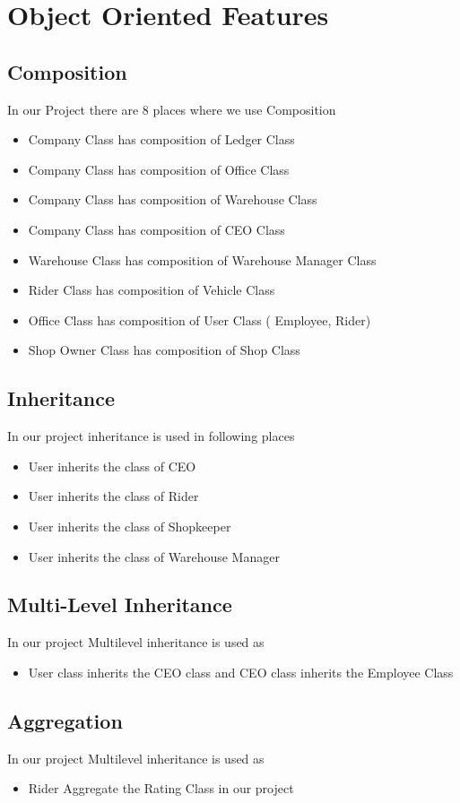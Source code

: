 \documentclass[12pt,a4paper]{article}
\begin{document}
\section{Object Oriented Features}
\subsection{Composition}
In our Project there are 8 places where we use Composition
\begin{itemize}
\item   Company Class has composition of Ledger Class
\item  Company Class has composition of Office Class
\item  Company Class has composition of Warehouse Class
\item  Company Class has composition of CEO Class
\item  Warehouse Class has composition of  Warehouse Manager Class
\item  Rider Class has composition of Vehicle Class
\item  Office Class has composition of User Class ( Employee, Rider)
\item  Shop Owner Class has composition of Shop Class
\end{itemize}
\subsection{Inheritance}
In our project inheritance is used in following places
\begin{itemize}
\item   User inherits the class of CEO
\item User inherits the class of Rider 
\item User inherits the class of Shopkeeper
\item User inherits the class of Warehouse Manager  
\end{itemize}
\subsection{Multi-Level Inheritance}
In our project Multilevel inheritance is used as
\begin{itemize}
\item User class inherits the CEO class and CEO class inherits the Employee Class
\end{itemize}
\subsection{Aggregation}
In our project Multilevel inheritance is used as
\begin{itemize}
\item Rider Aggregate the Rating Class in our project
\end{itemize}
\end{document}
